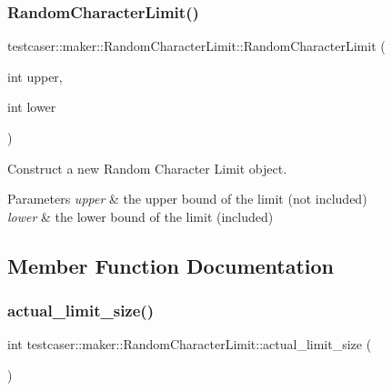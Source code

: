 \subsubsection{\texorpdfstring{RandomCharacterLimit()}{RandomCharacterLimit()}\hspace{0.1cm}{\footnotesize\ttfamily [2/2]}}
{\footnotesize\ttfamily testcaser\+::maker\+::\+Random\+Character\+Limit\+::\+Random\+Character\+Limit (\begin{DoxyParamCaption}\item[{int}]{upper,  }\item[{int}]{lower }\end{DoxyParamCaption})\hspace{0.3cm}{\ttfamily [inline]}}



Construct a new Random Character Limit object. 


\begin{DoxyParams}{Parameters}
{\em upper} & the upper bound of the limit (not included) \\
\hline
{\em lower} & the lower bound of the limit (included) \\
\hline
\end{DoxyParams}


\subsection{Member Function Documentation}
\mbox{\label{classtestcaser_1_1maker_1_1RandomCharacterLimit_a912c757f9c26f6ba3e3ec18db3c904c5}} 
\subsubsection{\texorpdfstring{actual\_limit\_size()}{actual\_limit\_size()}}
{\footnotesize\ttfamily int testcaser\+::maker\+::\+Random\+Character\+Limit\+::actual\+\_\+limit\+\_\+size (\begin{DoxyParamCaption}{ }\end{DoxyParamCaption})\hspace{0.3cm}{\ttfamily [inline]}}



